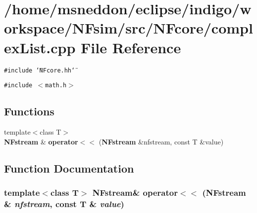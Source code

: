 \section{/home/msneddon/eclipse/indigo/workspace/NFsim/src/NFcore/complexList.cpp File Reference}
\label{complexList_8cpp}


{\tt \#include \char`\"{}NFcore.hh\char`\"{}}\par
{\tt \#include $<$math.h$>$}\par
\subsection*{Functions}
\begin{CompactItemize}
\item 
{\footnotesize template$<$class T$>$ }\\{\bf NFstream} \& {\bf operator$<$$<$} ({\bf NFstream} \&nfstream, const T \&value)
\end{CompactItemize}


\subsection{Function Documentation}
\subsubsection{\setlength{\rightskip}{0pt plus 5cm}template$<$class T$>$ {\bf NFstream}\& operator$<$$<$ ({\bf NFstream} \& {\em nfstream}, const T \& {\em value})\hspace{0.3cm}{\tt  [inline]}}\label{complexList_8cpp_ef588953052314e1b69285568a59947f}


